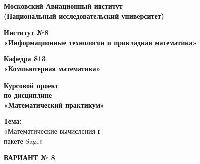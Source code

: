 \thispagestyle{empty}  %

\begin{center}
\textbf{
Московский Авиационный институт \\
(Национальный исследовательский университет)
}
\end{center}

\vspace{0.25em}
\begin{center}
\Large \textbf{ Институт №8 }\\
\large \textbf{ «Информационные технологии и прикладная математика» }\\
\end{center}

\vspace{0.25em}
\begin{center}
	\large \textbf {Кафедра 813 \\
	«Компьютерная математика» }\\
\end{center}

\vspace{0.25em}
\begin{center}
\large \textbf{Курсовой проект \\
по дисциплине \\
«Математический практикум»\\}
\end{center}

\vspace{0.25em}
\begin{center}
	\Large \textbf{ Тема:}\\
	\large«Математические вычисления в \\
	пакете Sage»
\end{center}

\vspace{0.5em}
\begin{center}
\Large \textbf{ВАРИАНТ № 8}\\
\end{center}

